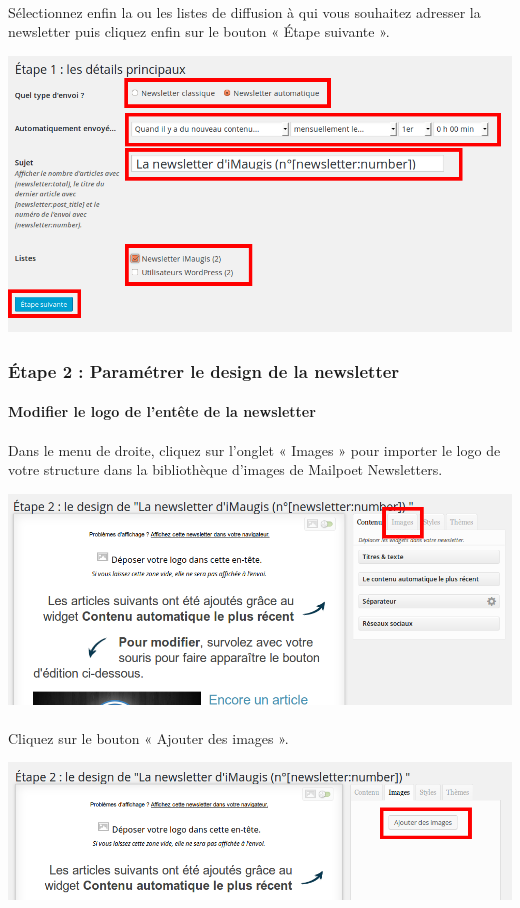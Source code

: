 \documentclass[10pt,a4paper]{article}
\begin{document}
\paragraph{}Sélectionnez enfin la ou les listes de diffusion à qui vous souhaitez adresser la newsletter puis cliquez enfin sur le bouton « Étape suivante ».
\begin{center}
\includegraphics[scale=0.3]{img/0216.png}
\end{center}
\subsubsection{Étape 2 : Paramétrer le design de la newsletter}
\paragraph{Modifier le logo de l'entête de la newsletter} Dans le menu de droite, cliquez sur l'onglet « Images » pour importer le logo de votre structure dans la bibliothèque d'images de Mailpoet Newsletters.
\begin{center}
\includegraphics[scale=0.3]{img/0217.png}
\end{center}
\paragraph{}Cliquez sur le bouton « Ajouter des images ».
\begin{center}
\includegraphics[scale=0.3]{img/0218.png}
\end{center}
\end{document}
